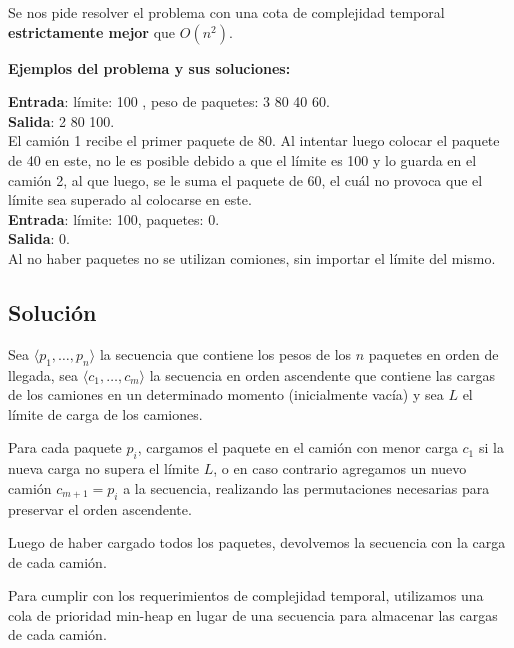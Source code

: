 \documentclass[a4paper, 10pt, twoside]{article}
\begin{document}
Se nos pide resolver el problema con una cota de complejidad temporal \textbf{estrictamente mejor} que $O(n^2)$.

\textbf{Ejemplos del problema y sus soluciones:}

\textbf{Entrada}: límite: 100 , peso de paquetes: 3 80 40 60. \\
\textbf{Salida}: 2 80 100. \\
El camión 1 recibe el primer paquete de 80. Al intentar luego colocar el paquete de 40 en este, no le es posible debido a que el límite es 100 y lo guarda en el camión 2, al que luego, se le suma el paquete de 60, el cuál no provoca que el límite sea superado al colocarse en este.\\

\textbf{Entrada}: límite: 100, paquetes: 0.\\
\textbf{Salida}: 0. \\
Al no haber paquetes no se utilizan comiones, sin importar el límite del mismo.

\subsection{Solución}

Sea $\langle p_1, \ldots, p_n \rangle$ la secuencia que contiene los pesos de los $n$ paquetes en orden de llegada, sea $\langle c_1, \ldots, c_m \rangle$ la secuencia en orden ascendente que contiene las cargas de los camiones en un determinado momento (inicialmente vacía) y sea $L$ el límite de carga de los camiones.

Para cada paquete $p_i$, cargamos el paquete en el camión con menor carga $c_1$ si la nueva carga no supera el límite $L$, o en caso contrario agregamos un nuevo camión $c_{m+1} = p_i$ a la secuencia, realizando las permutaciones necesarias para preservar el orden ascendente.

Luego de haber cargado todos los paquetes, devolvemos la secuencia con la carga de cada camión.

Para cumplir con los requerimientos de complejidad temporal, utilizamos una cola de prioridad min-heap en lugar de una secuencia para almacenar las cargas de cada camión.
\end{document}
